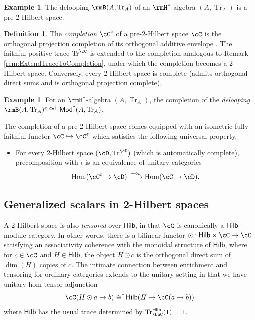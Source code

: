 \documentclass[12pt, reqno]{amsart}
\DeclareMathOperator{\Hom}{Hom}
\DeclareMathOperator{\Tr}{Tr}
\renewcommand{\cent}{\textup{\textcent}}
\newcommand{\Mod}{\mathsf{Mod}}
\newcommand{\Hilb}{\mathsf{Hilb}}
\theoremstyle{plain}
\theoremstyle{definition}
\newtheorem{defn}[thm]{Definition}
\newtheorem{ex}[thm]{Example}
\DeclareMathOperator{\isomeq}{\mathbin{\,\cong^\dag}}
\begin{document}
\begin{ex}
The delooping $\rmB(A,\Tr_A)$  of an $\rmH^*$-algebra $(A,\Tr_A)$ is a pre-2-Hilbert space.
\end{ex}

\begin{defn}
The \emph{completion} $\cC^\cent$ of a pre-2-Hilbert space $\cC$ is the orthogonal projection completion of its orthogonal additive envelope \cite{2411.01678}.
The faithful positive trace $\Tr^\cC$ is extended to the completion analogous to Remark \ref{rem:ExtendTraceToCompletion}, under which the completion becomes a 2-Hilbert space.
Conversely, every 2-Hilbert space is complete (admits orthogonal direct sums and is orthogonal projection complete).
\end{defn} 

\begin{ex}
For an $\rmH^*$-algebra $(A,\Tr_A)$, 
the completion of the \emph{delooping}
$\rmB(A,\Tr_A)^\cent\cong^\dag{\Mod^\dag(A,\Tr_A)}$.
\end{ex}

The completion of a pre-2-Hilbert space comes equipped with an isometric fully faithful functor $\cC\hookrightarrow \cC^\cent$
which satisfies the following universal property.
\begin{itemize} 
\item 
For every 2-Hilbert space $(\cD,\Tr^\cD)$ (which is automatically complete), precomposition with $\iota$ is an 
equivalence of unitary categories
$$
\Hom(\cC^\cent\to \cD)
\xrightarrow{-\circ \iota}
\Hom(\cC\to \cD).
$$
\end{itemize}

\subsection{Generalized scalars in 2-Hilbert spaces}

A 2-Hilbert space is also \emph{tensored} over $\Hilb$, in that $\cC$ is canonically a $\Hilb$-module category.
In other words, there is a bilinear functor $\odot\colon \Hilb\times \cC\to \cC$ satisfying an associativity coherence with the monoidal structure of $\Hilb$, where for $c\in \cC$ and $H\in \Hilb$, the object $H\odot c$ is the orthogonal direct sum of $\dim(H)$ copies of $c$. 
The intimate connection between enrichment and tensoring for ordinary categories \cite{MR2177301} extends to the unitary setting \cite{MR4814691}
in that we have unitary hom-tensor adjunction
$$
\cC(H\odot a \to b) \isomeq \Hilb(H\to \cC(a\to b))
$$
where $\Hilb$ has the usual trace determined by $\Tr^\Hilb_\bbC(1)=1$.
\end{document}
